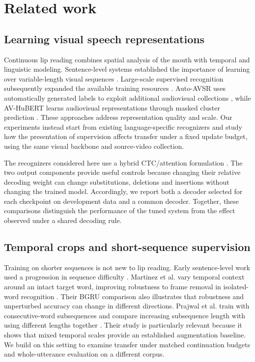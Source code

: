 \section{Related work}
\subsection{Learning visual speech representations}
Continuous lip reading combines spatial analysis of the mouth with temporal and
linguistic modeling. Sentence-level systems established the importance of learning
over variable-length visual sequences \cite{chung2017lipreading,afouras2022deep}.
Large-scale supervised recognition subsequently expanded the available training
resources \cite{shillingford2019large}. Auto-AVSR uses automatically generated
labels to exploit additional audiovisual collections \cite{ma2023autoavsr}, while
AV-HuBERT learns audiovisual representations through masked cluster prediction
\cite{shi2022avhubert}. These approaches address representation quality and scale.
Our experiments instead start from existing language-specific recognizers and
study how the presentation of supervision affects transfer under a fixed update
budget, using the same visual backbone and source-video collection.

The recognizers considered here use a hybrid CTC/attention formulation
\cite{graves2006ctc,watanabe2017hybrid}. The two output components provide useful
controls because changing their relative decoding weight can change substitutions,
deletions and insertions without changing the trained model. Accordingly, we report
both a decoder selected for each checkpoint on development data and a common
decoder. Together, these comparisons distinguish the performance of the tuned
system from the effect observed under a shared decoding rule.

\subsection{Temporal crops and short-sequence supervision}
Training on shorter sequences is not new to lip reading. Early sentence-level work
used a progression in sequence difficulty \cite{chung2017lipreading}.
Martinez et al. vary temporal context around an intact target word, improving
robustness to frame removal in isolated-word recognition
\cite{martinez2020lipreading}. Their BGRU comparison also illustrates that
robustness and unperturbed accuracy can change in different directions.
Prajwal et al. train with consecutive-word subsequences and compare increasing
subsequence length with using different lengths together
\cite{prajwal2022subword}. Their study is particularly relevant because it shows
that mixed temporal scales provide an established augmentation baseline. We build
on this setting to examine transfer under matched continuation budgets and
whole-utterance evaluation on a different corpus.

